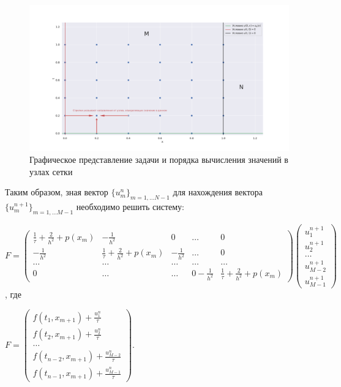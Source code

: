 \documentclass[14pt,a4paper]{extarticle}
\newcommand{\1}{\mathbbm{1}}
\begin{document}
\begin{figure}
    \centering
    \includegraphics[scale=0.4]{figs/scheme.pdf}
    \caption{Графическое представление задачи и порядка вычисления значений в узлах сетки}
    \label{scheme}
\end{figure}

Таким образом, зная вектор $\{u_m^n\}_{m = 1, \ldots N-1}$ для нахождения вектора $\{u_m^{n+1}\}_{m = 1, \ldots M-1}$ необходимо решить систему:

$F = \begin{pmatrix}
    \frac{1}{\tau} + \frac{2}{h^2} + p(x_m)  &   -\frac{1}{h^2}                           & 0               & \ldots & 0 \\
    -\frac{1}{h^2}                           &   \frac{1}{\tau} + \frac{2}{h^2} + p(x_m)  & -\frac{1}{h^2}  & \ldots & 0  \\
    \ldots  &\ldots  &   \ldots  & \ldots  & \ldots \\
    0 & \ldots & \ldots & 0 -\frac{1}{h^2}  &   \frac{1}{\tau} + \frac{2}{h^2} + p(x_m) 
\end{pmatrix}
\begin{pmatrix}
    u_1^{n + 1} \\
    u_2^{n + 1} \\
    \ldots \\
    u_{M-2}^{n+1} \\
    u_{M-1}^{n+1}
\end{pmatrix}$, 
где

$F=
\begin{pmatrix}
    f(t_{1}, x_{m+1}) + \frac{u_1^{n}}{\tau} \\
    f(t_{2}, x_{m+1}) + \frac{u_2^{n}}{\tau} \\
    \ldots \\
    f(t_{n-2}, x_{m+1}) + \frac{u_{M-2}^{n}}{\tau} \\
    f(t_{n-1}, x_{m+1}) + \frac{u_{M-1}^{n}}{\tau}
\end{pmatrix}$.
\end{document}
